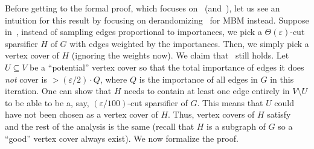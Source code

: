 \documentclass{theoretics}
\newcommand{\eps}{\varepsilon}
\begin{document}
Before getting to the formal proof, which focuses on~ (and~), 
let us see an intuition for this result by focusing on derandomizing~ for MBM instead. Suppose in~, instead of sampling edges proportional to importances, 
we pick a $\Theta(\eps)$-cut sparsifier $H$  of $G$ with edges weighted by the importances. Then, we simply pick a vertex cover of $H$ (ignoring the weights now). We claim that~ 
still holds. Let $U \subseteq V$ be a ``potential'' vertex cover so that the total importance of edges it does \emph{not} cover is $> (\eps/2) \cdot Q$, 
where $Q$ is the  importance of all edges in $G$ in this iteration. One can show that $H$ needs to contain at least one edge entirely in $V \setminus U$ 
to be able to be a, say, $(\eps/100)$-cut sparsifier of $G$. 
This means
that $U$ could have not been chosen as a vertex cover of $H$. Thus, vertex covers of $H$ satisfy~ and the rest of the analysis is the same (recall that $H$ is a subgraph of $G$ so
a ``good'' vertex cover always exist). We now formalize the proof. 
\end{document}
